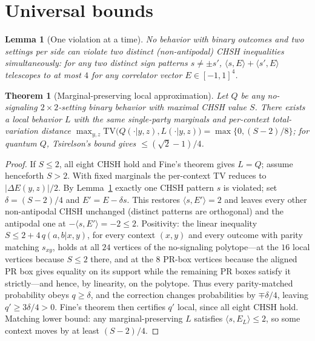 \documentclass[10pt,twocolumn]{article}
\newtheorem{theorem}{Theorem}
\newtheorem{lemma}{Lemma}
\begin{document}
\section{Universal bounds}
\label{sec:universal}

\begin{lemma}[One violation at a time]
\label{lem:onechsh}
No behavior with binary outcomes and two settings per side can violate two distinct (non-antipodal) CHSH inequalities simultaneously: for any two distinct sign patterns $s\ne\pm s'$, $\langle s,E\rangle + \langle s',E\rangle$ telescopes to at most $4$ for any correlator vector $E\in[-1,1]^4$.
\end{lemma}

\begin{theorem}[Marginal-preserving local approximation]
\label{prop:approx}
Let $Q$ be any \emph{no-signaling} $2{\times}2$-setting binary behavior with maximal CHSH value $S$. There exists a local behavior $L$ with the same single-party marginals and per-context total-variation distance $\max_{y,z}\mathrm{TV}\big(Q(\cdot|y,z),L(\cdot|y,z)\big) = \max\{0,(S-2)/8\}$; for quantum $Q$, Tsirelson's bound gives $\le (\sqrt2-1)/4$.
\end{theorem}

\begin{proof}
If $S\le2$, all eight CHSH hold and Fine's theorem gives $L=Q$; assume henceforth $S>2$. With fixed marginals the per-context TV reduces to $|\Delta E(y,z)|/2$. By Lemma~\ref{lem:onechsh} exactly one CHSH pattern $s$ is violated; set $\delta=(S-2)/4$ and $E' = E - \delta s$. This restores $\langle s,E'\rangle = 2$ and leaves every other non-antipodal CHSH unchanged (distinct patterns are orthogonal) and the antipodal one at $-\langle s,E'\rangle=-2\le2$. Positivity: the linear inequality $S \le 2 + 4\,q(a,b|x,y)$, for every context $(x,y)$ and every outcome with parity matching $s_{xy}$, holds at all $24$ vertices of the no-signaling polytope---at the $16$ local vertices because $S\le2$ there, and at the $8$ PR-box vertices because the aligned PR box gives equality on its support while the remaining PR boxes satisfy it strictly---and hence, by linearity, on the polytope. Thus every parity-matched probability obeys $q \ge \delta$, and the correction changes probabilities by $\mp\delta/4$, leaving $q' \ge 3\delta/4 > 0$. Fine's theorem then certifies $q'$ local, since all eight CHSH hold. Matching lower bound: any marginal-preserving $L$ satisfies $\langle s, E_L\rangle \le 2$, so some context moves by at least $(S-2)/4$.
\end{proof}
\end{document}
